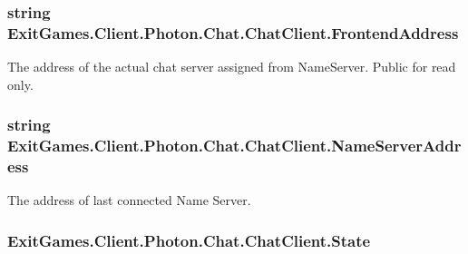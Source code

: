 \subsubsection[{\texorpdfstring{Frontend\+Address}{FrontendAddress}}]{\setlength{\rightskip}{0pt plus 5cm}string Exit\+Games.\+Client.\+Photon.\+Chat.\+Chat\+Client.\+Frontend\+Address\hspace{0.3cm}{\ttfamily [get]}}\hypertarget{class_exit_games_1_1_client_1_1_photon_1_1_chat_1_1_chat_client_a4693102ef8b77518b9eed0cbbdd650e1}{}\label{class_exit_games_1_1_client_1_1_photon_1_1_chat_1_1_chat_client_a4693102ef8b77518b9eed0cbbdd650e1}


The address of the actual chat server assigned from Name\+Server. Public for read only.

\subsubsection[{\texorpdfstring{Name\+Server\+Address}{NameServerAddress}}]{\setlength{\rightskip}{0pt plus 5cm}string Exit\+Games.\+Client.\+Photon.\+Chat.\+Chat\+Client.\+Name\+Server\+Address\hspace{0.3cm}{\ttfamily [get]}}\hypertarget{class_exit_games_1_1_client_1_1_photon_1_1_chat_1_1_chat_client_afc6baf1a806a9a9ea803b14889ffb8c3}{}\label{class_exit_games_1_1_client_1_1_photon_1_1_chat_1_1_chat_client_afc6baf1a806a9a9ea803b14889ffb8c3}


The address of last connected Name Server.

\subsubsection[{\texorpdfstring{State}{State}}]{ Exit\+Games.\+Client.\+Photon.\+Chat.\+Chat\+Client.\+State\hspace{0.3cm}{\ttfamily [get]}}\hypertarget{class_exit_games_1_1_client_1_1_photon_1_1_chat_1_1_chat_client_a5d523809d52088df6fbd8927523d6238}{}\label{class_exit_games_1_1_client_1_1_photon_1_1_chat_1_1_chat_client_a5d523809d52088df6fbd8927523d6238}


